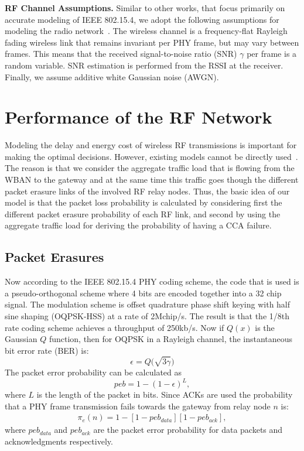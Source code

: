 \documentclass[10pt]{IEEEtran}
\newcounter{section:outage-analysis}
\begin{document}
\textbf{RF Channel Assumptions.} Similar to other works, that focus primarily on accurate modeling of IEEE 802.15.4, we adopt the following assumptions for modeling the radio network~\cite{kim2008:performance-802154}. The wireless channel is a frequency-flat Rayleigh fading wireless link that remains invariant per PHY frame, but may vary between frames. This means that the received signal-to-noise ratio (SNR) $\gamma$ per frame is a random variable. SNR estimation is performed from the RSSI at the receiver. Finally, we assume additive white Gaussian noise (AWGN).

\section{Performance of the RF Network}
\label{section:rf-radio-model}
Modeling the delay and energy cost of wireless RF transmissions is important for making the optimal decisions. However, existing models cannot be directly used~\cite{kim2008:performance-802154,bianchi-80211,wu02,Miluzzo08radiocharacterization}. The reason is that we consider the aggregate traffic load that is flowing from the WBAN to the gateway and at the same time this traffic goes though the different packet erasure links of the involved RF relay nodes. Thus, the basic idea of our model is that the packet loss probability is calculated by considering first the different packet erasure probability of each RF link, and second by using the aggregate traffic load for deriving the probability of having a CCA failure.

\subsection{Packet Erasures}
\label{section:erasures}
Now according to the IEEE 802.15.4 PHY coding scheme, the code that is used is a pseudo-orthogonal scheme where 4 bits are encoded together into a 32 chip signal.
The modulation scheme is offset quadrature phase shift keying with half sine shaping (OQPSK-HSS) at a rate of 2Mchip/s. The result is that the 1/8th rate coding scheme achieves a throughput of 250kb/s. Now if $Q(x)$ is the Gaussian $Q$ function, then for OQPSK in a Rayleigh channel, the instantaneous bit error rate (BER) is:
\begin{equation}\label{eqn:1}
    \epsilon= Q \Big ( \sqrt{3\gamma}  \Big )
\end{equation}
The packet error probability can be calculated as
\begin{equation}\label{eqn:3}
peb=1-(1-\epsilon)^{L},
\end{equation}
where $L$ is the length of the packet in bits. Since ACKs are used the probability that a PHY frame transmission fails towards the gateway from relay node $n$ is:
\begin{eqnarray}\label{eqn:2}
\pi_{e}(n) = 1- [1-peb_{data}][1-peb_{ack}],\end{eqnarray}
where $peb_{data}$ and $peb_{ack}$ are the packet error probability for data packets and acknowledgments respectively.
\end{document}
